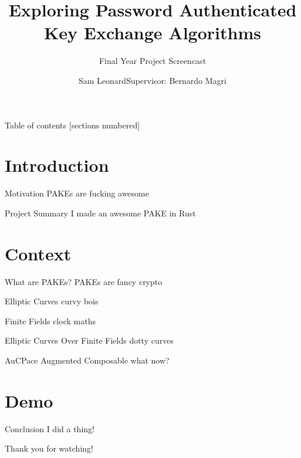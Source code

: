 \documentclass[hyperref={pdfpagemode=FullScreen}, aspectratio=169, 10pt]{beamer}
\title{Exploring Password Authenticated Key Exchange Algorithms}
\subtitle{Final Year Project Screencast}
\author{\texorpdfstring{Sam Leonard\newline Supervisor: Bernardo Magri}{Sam Leonard}}
\date{}
\begin{document}
\maketitle

\begin{frame}{Table of contents}
  [sections numbered]
  \tableofcontents%
\end{frame}

\section[Intro]{Introduction}

\begin{frame}{Motivation}
  PAKEs are fucking awesome
\end{frame}

\begin{frame}{Project Summary}
  I made an awesome PAKE in Rust
\end{frame}

\section{Context}

\begin{frame}{What are PAKEs?}
  PAKEs are fancy crypto
\end{frame}

\begin{frame}{Elliptic Curves}
  curvy bois
\end{frame}

\begin{frame}{Finite Fields}
  clock maths
\end{frame}

\begin{frame}{Elliptic Curves Over Finite Fields}
  dotty curves
\end{frame}

\begin{frame}{AuCPace}
  Augmented Composable what now?
\end{frame}

\section{Demo}

\begin{frame}{Conclusion}
  I did a thing!
\end{frame}

\begin{frame}[standout]
  Thank you for watching!
\end{frame}
\end{document}

